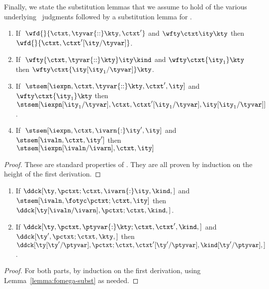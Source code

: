 Finally, we state the substitution lemmas that we assume to hold of
the various underlying \fomega\ judgments followed by a substitution
lemma for \ddc{}.

\begin{lemma}
  \begin{enumerate}
  \item If $\;\wfd{}{\ctxt,\tyvar{::}\kty,\ctxt'}$ and $\wfty \ctxt \ity
    \kty$ then $\wfd{}{\ctxt,\ctxt'[\ity/\tyvar]}$.
  \item If $\;\wfty {\ctxt,\tyvar{::}\kty} \ity \kind$ and $\wfty \ctxt {\ity_1} \kty$ then
    $\wfty \ctxt {\ity[\ity_1/\tyvar]} \kty$.
  \item If $\;\stsem[\iexpn,{\ctxt,\tyvar{::}\kty,\ctxt'},\ity]$ and $\wfty \ctxt {\ity_1}
    \kty$ then
    $\stsem[{\iexpn[\ity_1/\tyvar]},{\ctxt,\ctxt'[\ity_1/\tyvar]}, {\ity[\ity_1/\tyvar]}]$.
  \item If $\;\stsem[\iexpn,{\ctxt,\ivarn{:}\ity'},\ity]$ and 
    $\stsem[\ivaln,\ctxt,\ity']$ then 
    $\stsem[{\iexpn[\ivaln/\ivarn]},\ctxt,\ity]$
  \end{enumerate}
  \label{lemma:fomega-subst}
\end{lemma}

\begin{proof}
  These are standard properties of \fomega. They are all proven by
  induction on the height of the first derivation.
\end{proof}

\begin{lemma}
  \begin{enumerate}
  \item If $\ddck[\ty,{\pctxt;\ctxt,\ivarn{:}\ity},\kind,]$ and 
    $\stsem[\ivaln,{\fotyc \pctxt;\ctxt},\ity]$
    then $\ddck[\ty[\ivaln/\ivarn],\pctxt;\ctxt,\kind,]$.
  \item If $\ddck[\ty,{\pctxt,\ptyvar{:}\kty;\ctxt,\ctxt'},\kind,]$ and 
    $\ddck[\ty',\pctxt;\ctxt,\kty,]$
    then $\ddck[\ty[\ty'/\ptyvar],{\pctxt;\ctxt,\ctxt'[\ty'/\ptyvar]},{\kind[\ty'/\ptyvar]},]$.
  \end{enumerate}
  \label{lemma:ty-val-subst} %
  \label{lemma:ty-ty-subst}  %
  \label{lemma:ddc-subst}
\end{lemma}
\begin{proof}
  For both parts, by induction on the first derivation, using
  Lemma~\ref{lemma:fomega-subst} as needed.
\end{proof}

